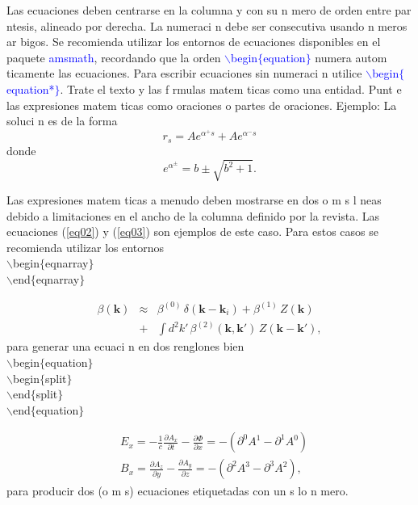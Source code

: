 \documentclass{article}
\begin{document}
Las ecuaciones deben centrarse en la columna y con su n mero de orden entre par ntesis, alineado por derecha. La numeraci n debe ser consecutiva usando n meros ar bigos. Se recomienda utilizar los entornos de ecuaciones disponibles en el paquete \textcolor{Blue}{\textsf{amsmath}},  recordando que
la orden \textcolor{Blue}{\textsf{$\backslash$begin$\{$equation$\}$}} numera autom ticamente las ecuaciones. Para escribir ecuaciones sin numeraci n utilice  \textcolor{Blue}{\textsf{$\backslash$begin$\{$equation*$\}$}}.
Trate el texto y las f rmulas matem ticas como una entidad. Punt e las expresiones matem ticas como oraciones o partes de oraciones. 
Ejemplo: La soluci n es de la forma
\begin{equation}
r_{s} = A e^{\alpha^{+}s} + A e^{\alpha^{-}s}
\label{eq01}
\end{equation}
donde 
\begin{equation*}
e^{\alpha^{\pm}} = b \pm \sqrt{b^{2}+1}.
\label{eq01a}
\end{equation*}


Las expresiones matem ticas a menudo deben mostrarse en dos o m s l neas debido a limitaciones en el ancho de la columna definido por la revista. Las ecuaciones (\ref{eq02}) y (\ref{eq03}) son ejemplos de este caso. Para estos casos se recomienda utilizar los entornos  \\
\color{Blue}
\textsf{$\backslash$begin$\{$eqnarray$\}$} \\ \textsf{$\backslash$end$\{$eqnarray$\}$} \\
\color{black} 

\begin{eqnarray}
\beta(\mathbf{k}) & \approx & \beta^{(0)}\,\delta(\mathbf{k}-\mathbf{k}_i) + \beta^{(1)}\,Z(\mathbf{k}) \nonumber\\
 & + & \int d^2k'\,\beta^{(2)}(\mathbf{k},\mathbf{k}')\,Z(\mathbf{k}-\mathbf{k}'),
\label{eq02}
\end{eqnarray}
para generar una ecuaci n en dos renglones    bien \\
\color{Blue}
\textsf{$\backslash$begin$\{$equation$\}$} \\ 
\textsf{$\backslash$begin$\{$split$\}$}  \\
\textsf{$\backslash$end$\{$split$\}$}  \\
\textsf{$\backslash$end$\{$equation$\}$}
\color{black}


\begin{equation}
\begin{split}
& E_{x}=-\frac{1}{c}\frac{\partial A_{x}}{\partial t}-\frac{\partial \Phi}{\partial x} = - (\partial^{0}A^{1}-\partial^{1}A^{0}) \\
& B_{x}=\frac{\partial A_{z}}{\partial y}-\frac{\partial A_{y}}{\partial z}=-(\partial^{2}A^{3}-\partial^{3}A^{2}),
\end{split}
\label{eq03}
\end{equation}
para producir dos (o m s) ecuaciones etiquetadas con un s lo n mero.
\end{document}

